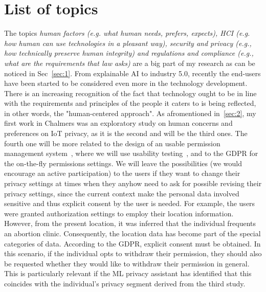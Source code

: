 \documentclass[11pt]{article}
\begin{document}
\section{List of topics}\label{sec:4}
The topics \textit{human factors (e.g. what human needs, prefers, expects), HCI (e.g. how human can use technologies in a pleasant way), security and privacy (e.g., how technically preserve human integrity) and regulations and compliance (e.g., what are the requirements that law asks)} are a big part of my research as can be noticed in Sec~\ref{sec:1}. From explainable AI to industry 5.0, recently the end-users have been started to be considered even more in the technology development. There is an increasing recognition of the fact that technology ought to be in line with the requirements and principles of the people it caters to is being reflected, in other words, the "human-centered approach". As afromentioned in~\ref{sec:2}, my first work in Chalmers was an exploratory study on human concerns and preferences on IoT privacy, as it is the second and will be the third ones. The fourth one will be more related to the design of an usable permission management system~\cite{liu2016pp}, where we will use usability testing~\cite{veale2018hci}, and to the GDPR for the on-the-fly permissions settings. We will leave the possibilities (we would encourage an active participation) to the users if they want to change their privacy settings at times when they anyhow need to ask for possible revising their privacy settings, since the current context make the personal data involved sensitive and thus explicit consent by the user is needed. For example, the users were granted authorization settings to employ their location information. However, from the present location, it was inferred that the individual frequents an abortion clinic. Consequently, the location data has become part of the special categories of data. According to the GDPR, explicit consent must be obtained. In this scenario, if the individual opts to withdraw their permission, they should also be requested whether they would like to withdraw their permission in general. This is particularly relevant if the ML privacy assistant has identified that this coincides with the individual's privacy segment derived from the third study.
\end{document}
